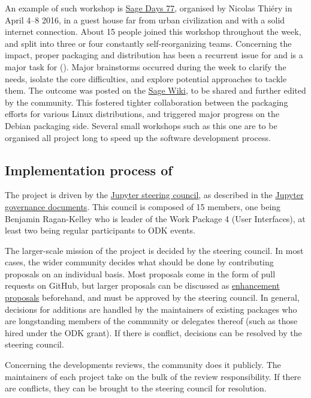 \documentclass{deliverablereport}
\begin{document}
An example of such workshop is
\href{https://wiki.sagemath.org/days77/}{Sage Days 77}, organised by
Nicolas Thiéry in April 4--8 2016, in a guest house far from urban
civilization and with a solid internet connection. About 15 people
joined this workshop throughout the week, and split into three or four
constantly self-reorganizing teams. Concerning the impact, proper
packaging and distribution has been a recurrent issue for \Sage and is
a major task for \ODK
(). Major
brainstorms occurred during the week to clarify the needs, isolate the
core difficulties, and explore potential approaches to tackle
them. The outcome was posted on the
\href{https://wiki.sagemath.org/days77/packaging}{Sage Wiki}, to be
shared and further edited by the community. This fostered tighter
collaboration between the packaging efforts for various Linux
distributions, and triggered major progress on the Debian packaging
side. Several small workshops such as this one are to be organised all
project long to speed up the software development process.


\subsection{Implementation process of \Jupyter}

The \Jupyter project is driven by the \href{https://jupyter.org/about.html}{Jupyter steering council}, as described in the \href{https://github.com/jupyter/governance}{Jupyter governance documents}. This council is composed of 15 members, one being Benjamin Ragan-Kelley who is leader of the Work Package 4 (User Interfaces),  at least two being regular participants to ODK events.

The larger-scale mission of the project is decided by the steering council. In most cases, the wider \Jupyter community decides what should be done by contributing proposals on an individual basis. Most proposals come in the form of pull requests on GitHub, but larger proposals can be discussed as \href{https://github.com/jupyter/enhancement-proposals}{enhancement proposals} beforehand, and must be approved by the steering council. In general, decisions for additions are handled by the maintainers of existing packages who are longstanding members of the community or delegates thereof (such as those hired under the ODK grant). If there is conflict, decisions can be resolved by the steering council.

Concerning the developments reviews, the \Jupyter community does it publicly. The maintainers of each project take on the bulk of the review responsibility. If there are conflicts, they can be brought to the steering council for resolution.
\end{document}
